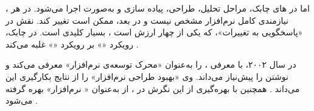اما در ‌های چابک، مراحل تحلیل، طراحی، پیاده سازی و
 به‌صورت  اجرا می‌شود. در هر ،
نیازمندی کامل نرم‌افزار مشخص نیست و در  بعد، ممکن است تغییر
کند. نقش  در «پاسخگویی به تغییرات»، که یکی از چهار ارزش
 است ، بسیار کلیدی است. در
 چابک، رویکرد «»
بر رویکرد «» غلبه می‌کند .

 در سال ۲۰۰۲، با معرفی 
،  را به‌عنوان «محرک توسعه‌ی نرم‌افزار» معرفی
می‌کند و نوشتن  را پیش‌نیاز  می‌داند. وی
«بهبود طراحی نرم‌افزار» را از نتایج بکارگیری این  می‌داند
. همچنین با بهره‌گیری از این نگرش در 
، از  به‌عنوان «
نرم‌افزار» بهره گرفته می‌شود .


